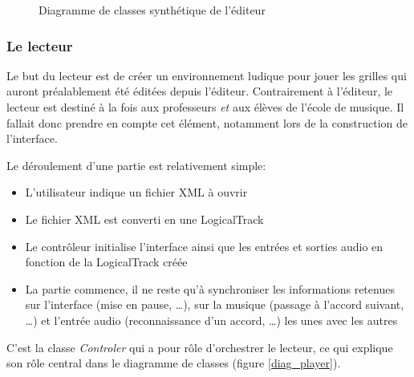 \begin{figure}[H]
\begin{center}
\caption{Diagramme de classes synthétique de l'éditeur}
\label{diag_editor}
\end{center}
\end{figure}

\subsubsection{Le lecteur}

Le but du lecteur est de créer un environnement ludique pour jouer les grilles qui auront préalablement été éditées depuis l'éditeur. Contrairement à l'éditeur, le lecteur est destiné à la fois aux professeurs \textit{et} aux élèves de l'école de musique. Il fallait donc prendre en compte cet élément, notamment lors de la construction de l'interface.

Le déroulement d'une partie est relativement simple:
\begin{itemize}
 \item L'utilisateur indique un fichier XML à ouvrir
 \item Le fichier XML est converti en une LogicalTrack
 \item Le contrôleur initialise l'interface ainsi que les entrées et sorties audio en fonction de la LogicalTrack créée
 \item La partie commence, il ne reste qu'à synchroniser les informations retenues sur l'interface (mise en pause, \dots), sur la musique (passage à l'accord suivant, \dots) et l'entrée audio (reconnaissance d'un accord, \dots) les unes avec les autres
\end{itemize}

C'est la classe \textit{Controler} qui a pour rôle d'orchestrer le lecteur, ce qui explique son rôle central dans le diagramme de classes (figure \ref{diag_player}).

